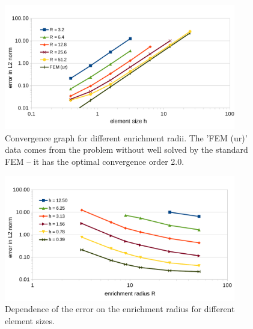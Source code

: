 \documentclass{elsarticle}
\newcommand{\figpath}{../graphics/}
\begin{document}
\begin{figure}[!htb]
  \centering    
  \includegraphics[width=0.9\textwidth]{results/radius_conv_1.pdf}
  \caption[Enrichment radius choice.]{Convergence graph for different enrichment radii. The 'FEM (ur)'
  data comes from the problem without well solved by the standard FEM -- it has the optimal convergence order 2.0.}
  \label{fig:radius_conv_1}
\end{figure}
\begin{figure}[!htb]
  \centering    
  \includegraphics[width=0.9\textwidth]{results/radius_conv_2.pdf}
  \caption[Enrichment radius choice.]{Dependence of the error on the enrichment radius for different
  element sizes.}
  \label{fig:radius_conv_2}
\end{figure}
\end{document}
